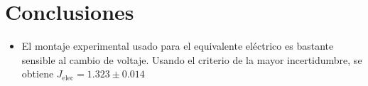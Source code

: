 \section{Conclusiones}
\begin{itemize}
    \item El montaje experimental usado para el equivalente eléctrico es bastante sensible al cambio de voltaje. Usando el criterio de la mayor incertidumbre, se obtiene $J_{\text{elec}} = 1.323 \pm 0.014$
\end{itemize}
